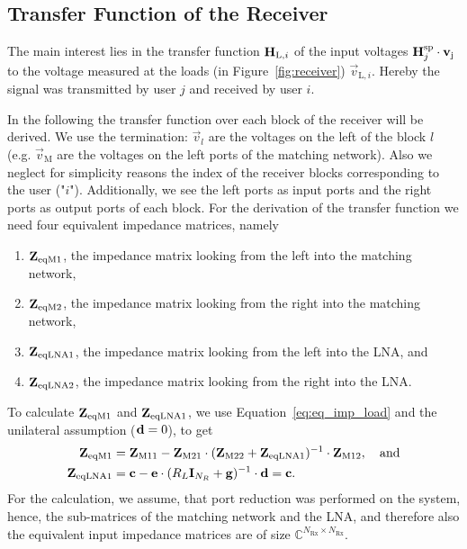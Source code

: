 \subsection{Transfer Function of the Receiver}
\label{sec:transf}
The main interest lies in the transfer function $\mathbf{H}_{\text{L},i}$ of the input voltages $\mathbf{H}_j^{\text{sp}}\cdot\mathbf{v}_\text{j}$ to the voltage measured at the loads (in Figure~\ref{fig:receiver}) $\vec{v}_{\text{L},i}$.
Hereby the signal was transmitted by user $j$ and received by user $i$.

In the following the transfer function over each block of the receiver will be derived.
We use the termination: $\vec{v}_l$ are the voltages on the left of the block $l$ (e.g. $\vec{v}_\text{M}$ are the voltages on the left ports of the matching network).
Also we neglect for simplicity reasons the index of the receiver blocks corresponding to the user ("$i$").
Additionally, we see the left ports as input ports and the right ports as output ports of each block.
For the derivation of the transfer function we need four equivalent impedance matrices, namely
\begin{enumerate}
\item{$\mathbf{Z}_\text{eqM1}$, the impedance matrix looking from the left into the matching network,}
\item{$\mathbf{Z}_\text{eqM2}$, the impedance matrix looking from the right into the matching network,}
\item{$\mathbf{Z}_\text{eqLNA1}$, the impedance matrix looking from the left into the LNA, and}
\item{$\mathbf{Z}_\text{eqLNA2}$, the impedance matrix looking from the right into the LNA.}
\end{enumerate}

To calculate $\mathbf{Z}_\text{eqM1}$ and $\mathbf{Z}_\text{eqLNA1}$, we use Equation~\eqref{eq:eq_imp_load} and the unilateral assumption ($\mathbf{d}=0$), to get
\begin{align}
\label{eq:zeqm1}
\mathbf{Z}_\text{eqM1} &= \mathbf{Z}_\text{M11} - \mathbf{Z}_\text{M21}\cdot(\mathbf{Z}_\text{M22} + \mathbf{Z}_\text{eqLNA1})^{-1}\cdot\mathbf{Z}_\text{M12},\quad\text{and}\\
\label{eq:zeqlna1}
\mathbf{Z}_\text{eqLNA1} &= \mathbf{c} - \mathbf{e}\cdot(R_L\mathbf{I}_{N_R} + \mathbf{g})^{-1}\cdot\mathbf{d} = \mathbf{c}.
\end{align}
For the calculation, we assume, that port reduction was performed on the system, hence, the sub-matrices of the matching network and the LNA, and therefore also the equivalent input impedance matrices are of size $\mathbb{C}^{N_\text{Rx}\times N_\text{Rx}}$.


